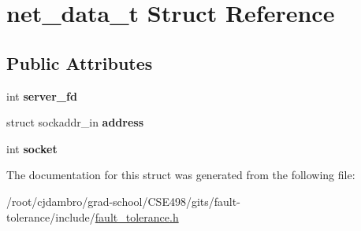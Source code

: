 \hypertarget{structnet__data__t}{\section{net\-\_\-data\-\_\-t Struct Reference}
\label{structnet__data__t}
}
\subsection*{Public Attributes}
\begin{DoxyCompactItemize}
\item 
\hypertarget{structnet__data__t_a9b4d4ee095b9c896d0cfdffae2f2d88e}{int {\bfseries server\-\_\-fd}}\label{structnet__data__t_a9b4d4ee095b9c896d0cfdffae2f2d88e}

\item 
\hypertarget{structnet__data__t_ab33e9a34a6b9c24faecc30e850d5960a}{struct sockaddr\-\_\-in {\bfseries address}}\label{structnet__data__t_ab33e9a34a6b9c24faecc30e850d5960a}

\item 
\hypertarget{structnet__data__t_ac2aaead41d89952203d845413f38c2d8}{int {\bfseries socket}}\label{structnet__data__t_ac2aaead41d89952203d845413f38c2d8}

\end{DoxyCompactItemize}


The documentation for this struct was generated from the following file\-:\begin{DoxyCompactItemize}
\item 
/root/cjdambro/grad-\/school/\-C\-S\-E498/gits/fault-\/tolerance/include/\hyperlink{fault__tolerance_8h}{fault\-\_\-tolerance.\-h}\end{DoxyCompactItemize}
